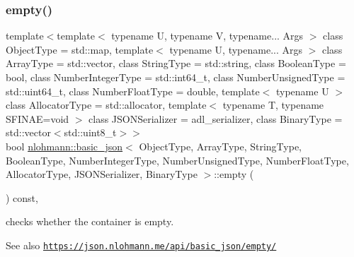 \subsubsection{\texorpdfstring{empty()}{empty()}}
{\footnotesize\ttfamily template$<$template$<$ typename U, typename V, typename... Args $>$ class Object\+Type = std\+::map, template$<$ typename U, typename... Args $>$ class Array\+Type = std\+::vector, class String\+Type  = std\+::string, class Boolean\+Type  = bool, class Number\+Integer\+Type  = std\+::int64\+\_\+t, class Number\+Unsigned\+Type  = std\+::uint64\+\_\+t, class Number\+Float\+Type  = double, template$<$ typename U $>$ class Allocator\+Type = std\+::allocator, template$<$ typename T, typename S\+F\+I\+N\+A\+E=void $>$ class J\+S\+O\+N\+Serializer = adl\+\_\+serializer, class Binary\+Type  = std\+::vector$<$std\+::uint8\+\_\+t$>$$>$ \\
bool \hyperlink{classnlohmann_1_1basic__json}{nlohmann\+::basic\+\_\+json}$<$ Object\+Type, Array\+Type, String\+Type, Boolean\+Type, Number\+Integer\+Type, Number\+Unsigned\+Type, Number\+Float\+Type, Allocator\+Type, J\+S\+O\+N\+Serializer, Binary\+Type $>$\+::empty (\begin{DoxyParamCaption}{ }\end{DoxyParamCaption}) const\hspace{0.3cm}{\ttfamily [inline]}, {\ttfamily [noexcept]}}



checks whether the container is empty. 

\begin{DoxySeeAlso}{See also}
\href{https://json.nlohmann.me/api/basic_json/empty/}{\tt https\+://json.\+nlohmann.\+me/api/basic\+\_\+json/empty/} 
\end{DoxySeeAlso}
\mbox{\label{classnlohmann_1_1basic__json_a931267ec3f09eb67e4382f321b2c52bc}} 
